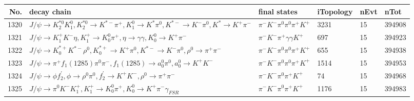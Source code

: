 \begin{table}[htbp] 
\begin{center}
\begin{small}
\begin{tabular}{rlllll}\hline\hline
 No. & decay chain & final states &  iTopology & nEvt & nTot \\\hline
1320&$J/\psi       \rightarrow K_2^{*0}       K_1^{0}        , K_2^{*0}        \rightarrow K^{*-}         \pi^{+}        , K_1^{0}         \rightarrow K^{*}          \pi^{0}        , K^{*-}          \rightarrow K^{-}          \pi^{0}        , K^{*}           \rightarrow K^{+}          \pi^{-}        $&$\pi^{-}        K^{-}          \pi^{0}        \pi^{0}        \pi^{+}        K^{+}          $& 3231&   15&394908\\
1321&$J/\psi       \rightarrow K_1^{+}        K^{-}          \eta          , K_1^{+}         \rightarrow K_0^{0}        \pi^{+}        , \eta           \rightarrow \gamma       \gamma       , K_0^{0}         \rightarrow K^{+}          \pi^{-}        $&$\pi^{-}        K^{-}          \pi^{+}        \gamma       \gamma       K^{+}          $&  697&   15&394923\\
1322&$J/\psi       \rightarrow K_{0}^{*+}     K^{*-}         \rho^{0}      , K_{0}^{*+}      \rightarrow K^{+}          \pi^{0}        , K^{*-}          \rightarrow K^{-}          \pi^{0}        , \rho^{0}       \rightarrow \pi^{+}        \pi^{-}        $&$\pi^{-}        K^{-}          \pi^{0}        \pi^{0}        \pi^{+}        K^{+}          $&  655&   15&394938\\
1323&$J/\psi       \rightarrow \pi^{+}        f_{1}(1285)    \pi^{0}        \pi^{-}        , f_{1}(1285)     \rightarrow a_{0}^{0}      \pi^{0}        , a_{0}^{0}       \rightarrow K^{+}          K^{-}          $&$\pi^{-}        K^{-}          \pi^{0}        \pi^{0}        \pi^{+}        K^{+}          $& 1514&   15&394953\\
1324&$J/\psi       \rightarrow \phi           f_2^{'}       , \phi            \rightarrow \rho^{0}      \pi^{0}        , f_2^{'}        \rightarrow K^{+}          K^{-}          , \rho^{0}       \rightarrow \pi^{+}        \pi^{-}        $&$\pi^{-}        K^{-}          \pi^{0}        \pi^{+}        K^{+}          $&   74&   15&394968\\
1325&$J/\psi       \rightarrow \pi^{0}        K^{-}          K_1^{+}        , K_1^{+}         \rightarrow K_0^{0}        \pi^{+}        , K_0^{0}         \rightarrow K^{+}          \pi^{-}        \gamma_{FSR} $&$\pi^{-}        K^{-}          \pi^{0}        \pi^{+}        K^{+}          $& 1176&   15&394983\\

\end{tabular}
\end{small}
\end{center}
\end{table}
